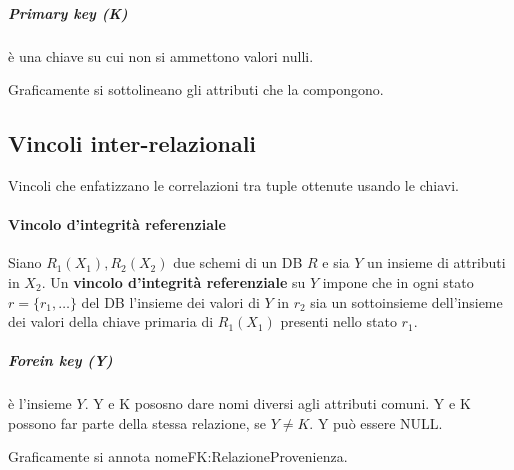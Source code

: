 \subparagraph{Primary key (K)} è una chiave su cui non si ammettono valori nulli.

Graficamente si sottolineano gli attributi che la compongono.

\subsection{Vincoli inter-relazionali}
Vincoli che enfatizzano le correlazioni tra tuple ottenute usando le chiavi.

\paragraph{Vincolo d'integrità referenziale} Siano $R_1(X_1), R_2(X_2)$ due schemi di un DB $R$ e sia $Y$ un insieme di attributi in $X_2$. Un \textbf{vincolo d'integrità referenziale} su $Y$ impone che in ogni stato $r=\{r_1,\dots\}$ del DB l'insieme dei valori di $Y$ in $r_2$ sia un sottoinsieme dell'insieme dei valori della chiave primaria di $R_1(X_1)$ presenti nello stato $r_1$.

\subparagraph{Forein key (Y)} è l'insieme $Y$. Y e K pososno dare nomi diversi agli attributi comuni. Y e K possono far parte della stessa relazione, se $Y\ne K$. Y può essere NULL.

Graficamente si annota nomeFK:RelazioneProvenienza.